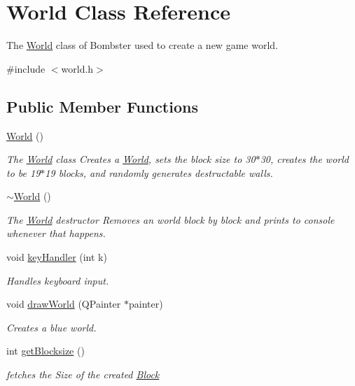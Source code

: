 \hypertarget{class_world}{\section{World Class Reference}
\label{class_world}
}


The \hyperlink{class_world}{World} class of Bombster used to create a new game world.  




{\ttfamily \#include $<$world.\-h$>$}

\subsection*{Public Member Functions}
\begin{DoxyCompactItemize}
\item 
\hyperlink{class_world_afa39d4e6f714a7a3691ac0c656f5e8a8}{World} ()
\begin{DoxyCompactList}\small\item\em The \hyperlink{class_world}{World} class Creates a \hyperlink{class_world}{World}, sets the block size to 30$\ast$30, creates the world to be 19$\ast$19 blocks, and randomly generates destructable walls. \end{DoxyCompactList}\item 
\hyperlink{class_world_a8c73fba541a5817fff65147ba47cd827}{$\sim$\-World} ()
\begin{DoxyCompactList}\small\item\em The \hyperlink{class_world}{World} destructor Removes an world block by block and prints to console whenever that happens. \end{DoxyCompactList}\item 
void \hyperlink{class_world_a83f49e35b8f8b33f14198e87b2fa7312}{key\-Handler} (int k)
\begin{DoxyCompactList}\small\item\em Handles keyboard input. \end{DoxyCompactList}\item 
void \hyperlink{class_world_a08d405bfe0cef56b06f731addeb22bcf}{draw\-World} (Q\-Painter $\ast$painter)
\begin{DoxyCompactList}\small\item\em Creates a blue world. \end{DoxyCompactList}\item 
int \hyperlink{class_world_ab44648ec788ea8dfe063a1fce7f86026}{get\-Blocksize} ()
\begin{DoxyCompactList}\small\item\em fetches the Size of the created \hyperlink{class_block}{Block} \end{DoxyCompactList}\item 

\end{DoxyCompactItemize}
